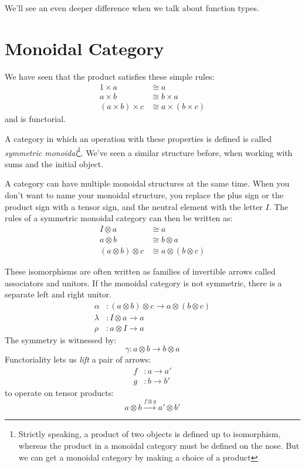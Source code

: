\documentclass[DaoFP]{subfiles}
\begin{document}
We'll see an even deeper difference when we talk about function types.

\section{Monoidal Category}

We have seen that the product satisfies these simple rules:
\begin{align*}
1 \times a &\cong a
\\
a \times b &\cong b \times a
\\
(a \times b) \times c &\cong a \times (b \times c)
\end{align*}
and is functorial. 

A category in which an operation with these properties is defined is called \emph{symmetric monoidal}\footnote{Strictly speaking, a product of two objects is defined up to isomorphism, whereas the product in a monoidal category must be defined on the nose. But we can get a monoidal category by making a choice of a product}. We've seen a similar structure before, when working with sums and the initial object. 

A category can have multiple monoidal structures at the same time. When you don't want to name your monoidal structure, you replace the plus sign or the product sign with a tensor sign, and the neutral element with the letter $I$. The rules of a symmetric monoidal category can then be written as:
\begin{align*}
I \otimes a &\cong a
\\
a \otimes b &\cong b \otimes a
\\
(a \otimes b) \otimes c &\cong a \otimes (b \otimes c)
\end{align*}

These isomorphisms are often written as families of invertible arrows called associators and unitors. If the monoidal category is not symmetric, there is a separate left and right unitor.
\begin{align*}
\alpha &\colon (a \otimes b) \otimes c \to a \otimes (b \otimes c)
\\
 \lambda &\colon I \otimes a \to a
 \\
 \rho &\colon a \otimes I \to a
\end{align*}
The symmetry is witnessed by:
\[ \gamma \colon a \otimes b \to b \otimes a \]
Functoriality lets us \emph{lift} a pair of arrows:
\begin{align*} 
f &\colon a \to a' \\
g &\colon b \to b'
\end{align*}
 to operate on tensor products:
\[ a \otimes b \xrightarrow{f \otimes g} a' \otimes b' \]
\end{document}
